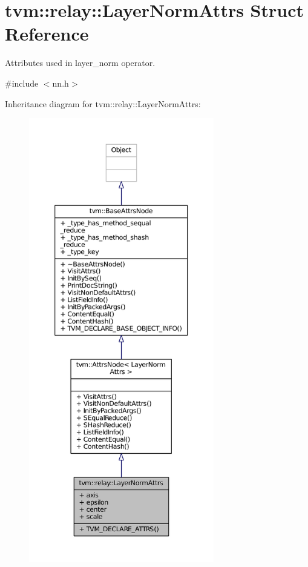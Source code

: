 \hypertarget{structtvm_1_1relay_1_1LayerNormAttrs}{}\section{tvm\+:\+:relay\+:\+:Layer\+Norm\+Attrs Struct Reference}
\label{structtvm_1_1relay_1_1LayerNormAttrs}


Attributes used in layer\+\_\+norm operator.  




{\ttfamily \#include $<$nn.\+h$>$}



Inheritance diagram for tvm\+:\+:relay\+:\+:Layer\+Norm\+Attrs\+:
\nopagebreak
\begin{figure}[H]
\begin{center}
\leavevmode
\includegraphics[height=550pt]{structtvm_1_1relay_1_1LayerNormAttrs__inherit__graph}
\end{center}
\end{figure}



